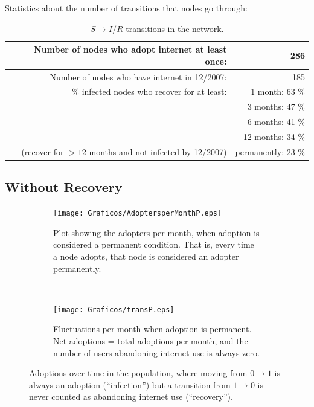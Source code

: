 \documentclass[12pt]{article}
\begin{document}
Statistics about the number of transitions that nodes go through:
\begin{table}[H]
\centering
\begin{tabular} {| r  r |}
\hline
Number of nodes who adopt internet at least once: & 286 \\ \hline
Number of nodes who have internet in 12/2007: & 185 \\ \hline
\% infected nodes who recover for at least: & 1 month: 63 \%\\ 
 & 3 months: 47 \% \\ %
 & 6 months: 41 \% \\ %
 & 12 months: 34 \% \\ %
\small{(recover for \( >12\) months and not infected by 12/2007)} & permanently: 23 \% \\ \hline 
\end{tabular}
\caption{\(S \rightarrow I/R\) transitions in the network.}
\end{table}

\subsection{Without Recovery}
\begin{figure}[H]
    \begin{subfigure}[t]{.55\textwidth}
        \texttt{[image: Graficos/AdoptersperMonthP.eps]}
        \caption{Plot showing the adopters per month, when \newline adoption is considered a permanent condition. That is, every time a node adopts, that node is considered an adopter permanently.}%
    \end{subfigure}
    ~
    \begin{subfigure}[t]{.55\textwidth}
	\texttt{[image: Graficos/transP.eps]}
        \caption{Fluctuations per month when adoption is permanent. Net adoptions = total adoptions per month, and the number of users abandoning internet use is always zero.}%
    \end{subfigure}
    \caption{Adoptions over time in the population, where moving from \(0 \rightarrow 1\) is always an adoption (``infection'') but a transition from \(1 \rightarrow 0\) is never counted as abandoning internet use (``recovery'').}
\end{figure}
\end{document}
